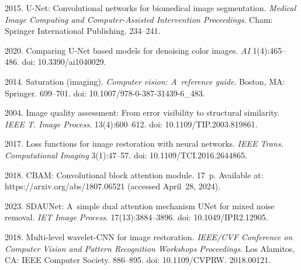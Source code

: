   \begin{multicols}{2}

\renewcommand{\bibname}{\protect\rmfamily References}

{\small\frenchspacing
 {%
 \begin{thebibliography}{99} 
 
 \vspace*{-6pt}
 
     2015.
    U-Net: Convolutional networks for biomedical image segmentation. \textit{Medical Image
    Computing and Computer-Assisted Intervention Proceedings}.  Cham: Springer
    International Publishing. 234--241.
    
     2020. Comparing U-Net based models
    for denoising color images.  \textit{AI} 1(4):465--486. doi: 10.3390/ai1040029.
    
     2014.
    Saturation (imaging). \textit{Computer vision: A~reference
    guide}. Boston, MA: Springer. 699--701. doi: 10.1007/978-0-387-31439-6\_483.
    
      2004.
    Image quality assessment: From error visibility to structural similarity.
    \textit{IEEE T. Image Process.} 13(4):600--612. doi: 10.1109/TIP.2003.819861.
    
     2017.
    Loss functions for image restoration with neural networks. \textit{IEEE
    Trans. Computational Imaging} 3(1):47--57. doi: 10.1109/TCI.2016.2644865.
  
     2018.
    CBAM: Convolutional block attention module. 17~p. 
    Available at: {\sf  https://arxiv.org/abs/1807.06521} (accessed April~28, 2024).
    
     2023.
    SDAUNet: A~simple dual attention mechanism UNet for mixed noise removal. \textit{IET Image Process.}
 17(13):3884--3896. doi: 10.1049/IPR2.12905.
   
     2018.
    Multi-level wavelet-CNN for image restoration. \textit{IEEE/CVF  Conference on
    Computer Vision and Pattern Recognition Workshops Proceedings}.  Los Alamitos, CA:
    IEEE Computer Society. 886--895. doi: 10.1109/CVPRW. 2018.00121.
    

\end{thebibliography}}}
\end{multicols}

